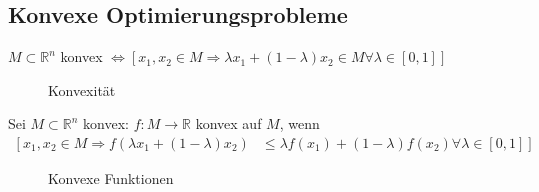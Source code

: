 \subsection{Konvexe Optimierungsprobleme}
$M\subset\mathbb{R}^n$ konvex $\Leftrightarrow \left[x_1,x_2\in M\Rightarrow \lambda x_1+(1-\lambda)x_2\in M\forall\lambda\in[0,1]\right]$
\begin{figure}[!htb]
	\centering
	\subfloat[konvex]{}\qquad
	\caption{Konvexität}
	\label{fig:kap_1_konvex}
\end{figure}

Sei $M\subset\mathbb{R}^n$ konvex: $f:M\rightarrow\mathbb{R}$ konvex auf $M$, wenn 
\begin{align*}
	\left[ x_1,x_2\in M \Rightarrow f(\lambda x_1+(1-\lambda)x_2)\right. & \left.\le \lambda f(x_1)+(1-\lambda)f(x_2)\forall\lambda\in[0,1]\right]
\end{align*}
\begin{figure}[!htb]
	\centering
	\subfloat[$f$ konvex]{}\qquad
	\caption{Konvexe Funktionen}
	\label{fig:kap_1_konvex_fkt}
\end{figure}

